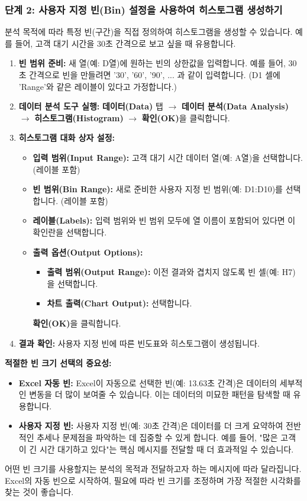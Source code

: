 \documentclass[11pt,a4paper]{article}
\theoremstyle{definition}
\begin{document}
\subsubsection*{단계 2: 사용자 지정 빈(Bin) 설정을 사용하여 히스토그램 생성하기}
분석 목적에 따라 특정 빈(구간)을 직접 정의하여 히스토그램을 생성할 수 있습니다. 예를 들어, 고객 대기 시간을 30초 간격으로 보고 싶을 때 유용합니다.

\begin{enumerate}
    \item \textbf{빈 범위 준비:} 새 열(예: D열)에 원하는 빈의 상한값을 입력합니다. 예를 들어, 30초 간격으로 빈을 만들려면 '30', '60', '90', ... 과 같이 입력합니다. (D1 셀에 'Range'와 같은 레이블이 있다고 가정합니다.)
    \item \textbf{데이터 분석 도구 실행:} \textbf{데이터(Data)} 탭 $\rightarrow$ \textbf{데이터 분석(Data Analysis)} $\rightarrow$ \textbf{히스토그램(Histogram)} $\rightarrow$ \textbf{확인(OK)}을 클릭합니다.
    \item \textbf{히스토그램 대화 상자 설정:}
    \begin{itemize}
        \item \textbf{입력 범위(Input Range):} 고객 대기 시간 데이터 열(예: A열)을 선택합니다. (레이블 포함)
        \item \textbf{빈 범위(Bin Range):} 새로 준비한 사용자 지정 빈 범위(예: D1:D10)를 선택합니다. (레이블 포함)
        \item \textbf{레이블(Labels):} 입력 범위와 빈 범위 모두에 열 이름이 포함되어 있다면 이 확인란을 선택합니다.
        \item \textbf{출력 옵션(Output Options):}
        \begin{itemize}
            \item \textbf{출력 범위(Output Range):} 이전 결과와 겹치지 않도록 빈 셀(예: H7)을 선택합니다.
            \item \textbf{차트 출력(Chart Output):} 선택합니다.
        \end{itemize}
        \textbf{확인(OK)}을 클릭합니다.
    \end{itemize}
    \item \textbf{결과 확인:} 사용자 지정 빈에 따른 빈도표와 히스토그램이 생성됩니다.
\end{enumerate}

\begin{tipbox}
\textbf{적절한 빈 크기 선택의 중요성:}
\begin{itemize}
    \item \textbf{Excel 자동 빈:} Excel이 자동으로 선택한 빈(예: 13.63초 간격)은 데이터의 세부적인 변동을 더 많이 보여줄 수 있습니다. 이는 데이터의 미묘한 패턴을 탐색할 때 유용합니다.
    \item \textbf{사용자 지정 빈:} 사용자 지정 빈(예: 30초 간격)은 데이터를 더 크게 요약하여 전반적인 추세나 문제점을 파악하는 데 집중할 수 있게 합니다. 예를 들어, "많은 고객이 긴 시간 대기하고 있다"는 핵심 메시지를 전달할 때 더 효과적일 수 있습니다.
\end{itemize}
어떤 빈 크기를 사용할지는 분석의 목적과 전달하고자 하는 메시지에 따라 달라집니다. Excel의 자동 빈으로 시작하여, 필요에 따라 빈 크기를 조정하며 가장 적절한 시각화를 찾는 것이 좋습니다.
\end{tipbox}
\end{document}
